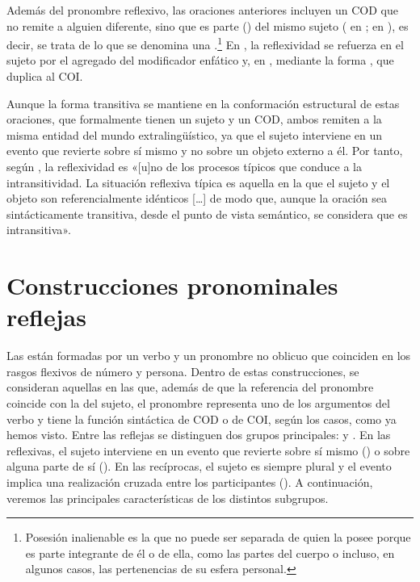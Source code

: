 Además del pronombre reflexivo, las oraciones anteriores incluyen un COD que no
remite a alguien diferente, sino que es parte () del mismo
sujeto ( en ;  en
), es decir, se trata de lo que se denomina una
.\footnote{\label{fn:10-inalienable}Posesión
inalienable es la que no puede ser separada de quien la posee porque es parte
integrante de él o de ella, como las partes del cuerpo o incluso, en algunos
casos, las pertenencias de su esfera personal.} En , la
reflexividad se refuerza en el sujeto por el agregado del modificador enfático
 y, en , mediante la forma ,
que duplica al COI.

\begin{recuadro}
Aunque la forma transitiva se mantiene en la conformación estructural de estas
oraciones, que formalmente tienen un sujeto y un COD, ambos remiten a la misma
entidad del mundo extralingüístico, ya que el sujeto interviene en un evento que
revierte sobre sí mismo y no sobre un objeto externo a él. Por tanto, según
\textcite[499--500]{morenocabrera1991}, la reflexividad es «[u]no de los
procesos típicos que conduce a la intransitividad. La situación reflexiva típica
es aquella en la que el sujeto y el objeto son referencialmente idénticos
[\ldots] de modo que, aunque la oración sea sintácticamente transitiva, desde el
punto de vista semántico, se considera que es intransitiva».
\end{recuadro}

\section{Construcciones pronominales reflejas}\label{sec:10-reflejas}

Las  están formadas por un verbo y un
pronombre no oblicuo que coinciden en los rasgos flexivos de número y persona.
Dentro de estas construcciones, se consideran  aquellas en las
que, además de que la referencia del pronombre coincide con la del sujeto, el
pronombre representa uno de los argumentos del verbo y tiene la función
sintáctica de COD o de COI, según los casos, como ya hemos visto. Entre las
reflejas se distinguen dos grupos principales:  y
. En las reflexivas, el sujeto interviene en un evento que
revierte sobre sí mismo () o sobre alguna parte de sí
(). En las recíprocas, el sujeto
es siempre plural y el evento implica una realización cruzada entre los
participantes (). A continuación,
veremos las principales características de los distintos subgrupos.

